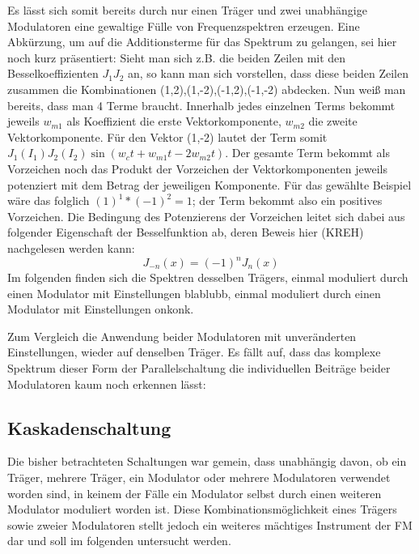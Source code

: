Es lässt sich somit bereits durch nur einen Träger und zwei unabhängige Modulatoren eine gewaltige Fülle von Frequenzspektren erzeugen. Eine Abkürzung, um auf die Additionsterme für das Spektrum zu gelangen, sei hier noch kurz präsentiert: Sieht man sich z.B. die beiden Zeilen mit den Besselkoeffizienten \begin{math} J_1J_2 \end{math} an, so kann man sich vorstellen, dass diese beiden Zeilen zusammen die Kombinationen (1,2),(1,-2),(-1,2),(-1,-2) abdecken. Nun weiß man bereits, dass man 4 Terme braucht. Innerhalb jedes einzelnen Terms bekommt jeweils \begin{math} w_{m1} \end{math} als Koeffizient die erste Vektorkomponente, \begin{math} w_{m2} \end{math} die zweite Vektorkomponente. Für den Vektor (1,-2) lautet der Term somit \begin{math} J_1(I_1)J_2(I_2)\sin(w_ct + w_{m1}t - 2w_{m2}t) \end{math}. Der gesamte Term bekommt als Vorzeichen noch das Produkt der Vorzeichen der Vektorkomponenten jeweils potenziert mit dem Betrag der jeweiligen Komponente. Für das gewählte Beispiel wäre das folglich \begin{math} (1)^1*(-1)^2 = 1 \end{math}; der Term bekommt also ein positives Vorzeichen. Die Bedingung des Potenzierens der Vorzeichen leitet sich dabei aus folgender Eigenschaft der Besselfunktion ab, deren Beweis hier (KREH) nachgelesen werden kann:
\begin{equation}
J_{-n}(x) = (-1)^nJ_n(x)
\end{equation}
Im folgenden finden sich die Spektren desselben Trägers, einmal moduliert durch einen Modulator mit Einstellungen blablubb,
einmal moduliert durch einen Modulator mit Einstellungen onkonk.

Zum Vergleich die Anwendung beider Modulatoren mit unveränderten Einstellungen, wieder auf denselben Träger. Es fällt auf, dass das komplexe Spektrum dieser Form der Parallelschaltung die individuellen Beiträge beider Modulatoren kaum noch erkennen lässt:


\subsection{Kaskadenschaltung}

Die bisher betrachteten Schaltungen war gemein, dass unabhängig davon, ob ein Träger, mehrere Träger, ein Modulator oder mehrere Modulatoren verwendet worden sind, in keinem der Fälle ein Modulator selbst durch einen weiteren Modulator moduliert worden ist. Diese Kombinationsmöglichkeit eines Trägers sowie zweier Modulatoren stellt jedoch ein weiteres mächtiges Instrument der FM dar und soll im folgenden untersucht werden.

